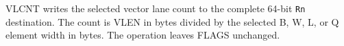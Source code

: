 VLCNT writes the selected vector lane count to the complete 64-bit \texttt{Rn}
destination.  The count is VLEN in bytes divided by the selected B, W, L, or Q
element width in bytes.  The operation leaves FLAGS unchanged.
